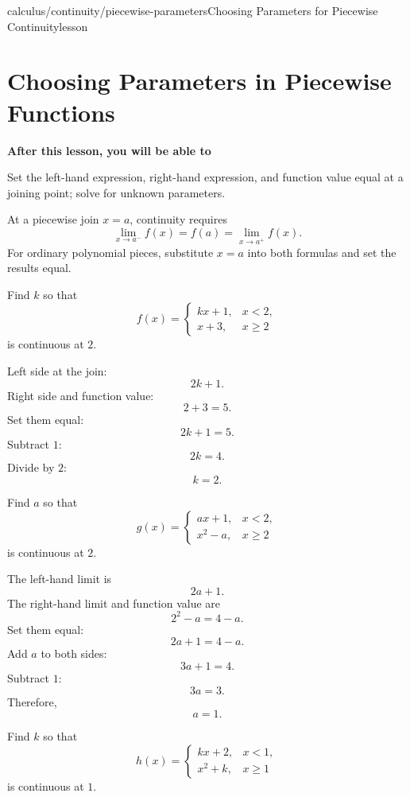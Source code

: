 \documentclass[11pt,openany]{book}
\theoremstyle{bgplain}
\newcounter{bgexample}[chapter]
\newcommand{\lessonobjective}[1]{%
  \par\Needspace{4\baselineskip}\addvspace{0.6em}%
  {\bfseries\color{BGInk}After this lesson, you will be able to}\par\smallskip
  #1\par\addvspace{0.5em}%
}
\begin{document}
\begin{webpage}{calculus/continuity/piecewise-parameters}{Choosing Parameters for Piecewise Continuity}{lesson}
\section{Choosing Parameters in Piecewise Functions}

\lessonobjective{
Set the left-hand expression, right-hand expression, and function value equal at a joining point; solve for unknown parameters.
}

At a piecewise join \(x=a\), continuity requires
\[
  \lim_{x\to a^-}f(x)
  =f(a)
  =\lim_{x\to a^+}f(x).
\]
For ordinary polynomial pieces, substitute \(x=a\) into both formulas and set the results equal.

\begin{bgguided}[title={One parameter}]
Find \(k\) so that
\[
  f(x)=
  \begin{cases}
    kx+1,&x<2,\\
    x+3,&x\ge2
  \end{cases}
\]
is continuous at \(2\).

\begin{bgsolution}
Left side at the join:
\[
  2k+1.
\]
Right side and function value:
\[
  2+3=5.
\]
Set them equal:
\[
  2k+1=5.
\]
Subtract \(1\):
\[
  2k=4.
\]
Divide by \(2\):
\[
  \boxed{k=2}.
\]
\end{bgsolution}
\end{bgguided}

\begin{bgexample}[title={The parameter appears in both pieces}]
Find \(a\) so that
\[
  g(x)=
  \begin{cases}
    ax+1,&x<2,\\
    x^2-a,&x\ge2
  \end{cases}
\]
is continuous at \(2\).

\begin{bgsolution}
The left-hand limit is
\[
  2a+1.
\]
The right-hand limit and function value are
\[
  2^2-a=4-a.
\]
Set them equal:
\[
  2a+1=4-a.
\]
Add \(a\) to both sides:
\[
  3a+1=4.
\]
Subtract \(1\):
\[
  3a=3.
\]
Therefore,
\[
  \boxed{a=1}.
\]
\end{bgsolution}
\end{bgexample}

\begin{bgexample}[title={Exam-level: no parameter works}]
Find \(k\) so that
\[
  h(x)=
  \begin{cases}
    kx+2,&x<1,\\
    x^2+k,&x\ge1
  \end{cases}
\]
is continuous at \(1\).


\end{bgexample}
\end{webpage}
\end{document}
